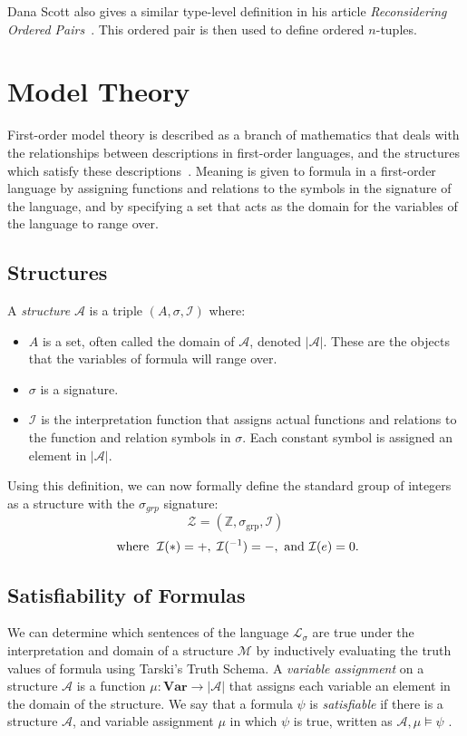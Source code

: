 \documentclass[11pt]{report}
\theoremstyle{definition}
\theoremstyle{theorem}
\theoremstyle{lemma}
\begin{document}
Dana Scott also gives a similar type-level definition in his article \emph{Reconsidering Ordered Pairs}~\cite{dscott}.
This ordered pair is then used to define ordered $n$-tuples.

\section{Model Theory}
First-order model theory is described as a branch of mathematics that deals with the relationships between descriptions in first-order languages, and the structures which satisfy these descriptions~\cite{stanmodel}.
Meaning is given to formula in a first-order language by assigning functions and relations to the symbols in the signature of the language, and by specifying a set that acts as the domain for the variables of the language to range over.

\subsection{Structures}\label{def:structures}
A \emph{structure} \cite[ch.~2.1]{selinger} $\mathcal{A}$ is a triple $(A, \sigma,\mathcal{I})$ where:
\begin{itemize}
  \item $A$ is a set, often called the domain of $\mathcal{A}$, denoted $|\mathcal{A}|$. These are the objects that the variables of formula will range over. 
  \item $\sigma$ is a signature.
  \item $\mathcal I$ is the interpretation function that assigns actual functions and relations to the function and relation symbols in $\sigma$. Each constant symbol is  assigned an element in $|\mathcal{A}|$.
\end{itemize}
Using this definition, we can now formally define the standard group of integers as a structure with the $\sigma_{\mathit{grp}}$ signature:
$$\mathcal{Z} = (\mathbb{Z}, \sigma_{\text{grp}}, \mathcal{I})$$
$$\text{ where \hspace{1mm}} \mathcal{I}(*) = +,\hspace{1mm} \mathcal{I}(^{-1}) = -, \text{ and } \mathcal{I}(e) = 0.$$

\subsection{Satisfiability of Formulas}
We can determine which sentences of the language $\mathcal{L_\sigma}$ are true under the interpretation and domain of a structure $\mathcal{M}$ by inductively evaluating the truth values of formula using Tarski's Truth Schema\cite{tarski}.
A \emph{variable assignment} on a structure $\mathcal{A}$ is a function $\mu: \textbf{Var} \rightarrow |\mathcal{A}|$ that assigns each variable an element in the domain of the structure.
We say that a formula $\psi$ is \emph{satisfiable} if there is a structure $\mathcal A$, and variable assignment $\mu$ in which $\psi$ is true, written as $\mathcal{A}, \mu \vDash \psi$ \cite[ch.~2.3]{selinger}.\\
\end{document}

